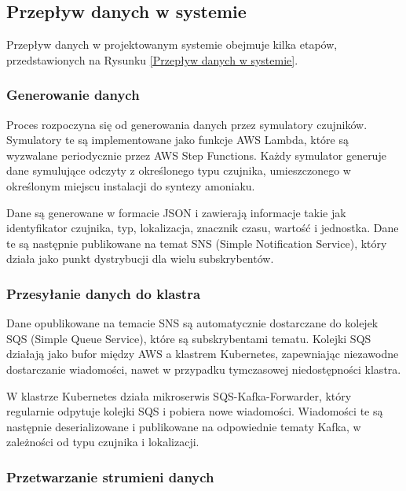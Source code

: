 \subsection{Przepływ danych w systemie}
\label{subsec:przeplyw_danych}

Przepływ danych w projektowanym systemie obejmuje kilka etapów, przedstawionych na Rysunku \ref{Przepływ danych w systemie}.


\subsubsection{Generowanie danych}
\label{subsubsec:generowanie_danych}

Proces rozpoczyna się od generowania danych przez symulatory czujników. Symulatory te są implementowane jako funkcje AWS Lambda,
które są wyzwalane periodycznie przez AWS Step Functions. Każdy symulator generuje dane symulujące odczyty z określonego typu czujnika,
umieszczonego w określonym miejscu instalacji do syntezy amoniaku.

Dane są generowane w formacie JSON i zawierają informacje takie jak identyfikator czujnika, typ, lokalizacja, znacznik czasu, wartość i
jednostka. Dane te są następnie publikowane na temat SNS (Simple Notification Service), który działa jako punkt dystrybucji dla wielu subskrybentów.

\subsubsection{Przesyłanie danych do klastra}
\label{subsubsec:przesylanie_danych}

Dane opublikowane na temacie SNS są automatycznie dostarczane do kolejek SQS (Simple Queue Service), które są subskrybentami tematu. Kolejki SQS działają jako bufor między AWS a klastrem Kubernetes, zapewniając niezawodne dostarczanie wiadomości, nawet w przypadku tymczasowej niedostępności klastra.

W klastrze Kubernetes działa mikroserwis SQS-Kafka-Forwarder, który regularnie odpytuje kolejki SQS i pobiera nowe wiadomości. Wiadomości te są następnie deserializowane i publikowane na odpowiednie tematy Kafka, w zależności od typu czujnika i lokalizacji.

\subsubsection{Przetwarzanie strumieni danych}
\label{subsubsec:przetwarzanie_strumieni}

